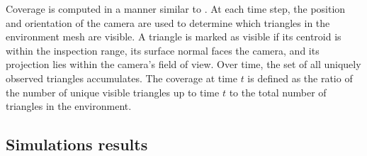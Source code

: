 Coverage is computed in a manner similar to \cite{amer2023visual}. At each time step, the position and orientation of the camera are used to determine which triangles in the environment mesh are visible. A triangle is marked as visible if its centroid is within the inspection range, its surface normal faces the camera, and its projection lies within the camera's field of view. Over time, the set of all uniquely observed triangles accumulates. The coverage at time $t$ is defined as the ratio of the number of unique visible triangles up to time $t$ to the total number of triangles in the environment.

\subsection{Simulations results}

\begin{table}[t]
    \centering
    \caption{Coverage performance comparison between \ac{REACT} and \ac{CPP} baseline showing inspection time, recovery time, total mission duration, and final environmental coverage. }
    \label{tab:performance_metrics}
    {\large
    }
    \vspace{0.5em}
\end{table}

\begin{table}[b]
    \centering
    \caption{Comparison of tether constraint compliance showing the maximum tether length reached and the total duration of tether length exceedance.}
    \label{tab:tether_metrics}
    {\Large
    }
    \vspace{0.5em}
\end{table}

